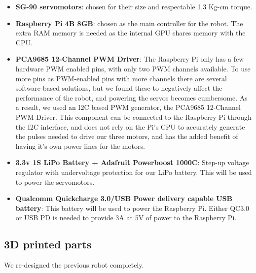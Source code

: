 \begin{itemize}
    \item \textbf{SG-90 servomotors}: chosen for their size and respectable 1.3 Kg-cm torque. 
    \item \textbf{Raspberry Pi 4B 8GB}: chosen as the main controller for the robot. The extra RAM memory is needed as the internal GPU shares memory with the CPU.
    
    \item \textbf{PCA9685 12-Channel PWM Driver}: The Raspberry Pi only has a few hardware PWM enabled pins, with only two PWM channels available. To use more pins as PWM-enabled pins with more channels there are several software-based solutions, but we found these to negatively affect the performance of the robot, and powering the servos becomes cumbersome. As a result, we used an I2C based PWM generator, the PCA9685 12-Channel PWM Driver. This component can be connected to the Raspberry Pi through the I2C interface, and does not rely on the Pi's CPU to accurately generate the pulses needed to drive our three motors, and has the added benefit of having it's own power lines for the motors.
    \item \textbf{3.3v 1S LiPo Battery + Adafruit Powerboost 1000C}: Step-up voltage regulator with undervoltage protection for our LiPo battery. This will be used to power the servomotors.
    
    \item \textbf{Qualcomm Quickcharge 3.0/USB Power delivery capable USB battery}: This battery will be used to power the Raspberry Pi. Either QC3.0 or USB PD is needed to provide 3A at 5V of power to the Raspberry Pi.
    \end{itemize}

\subsection{3D printed parts}

We re-designed the previous robot completely. 
